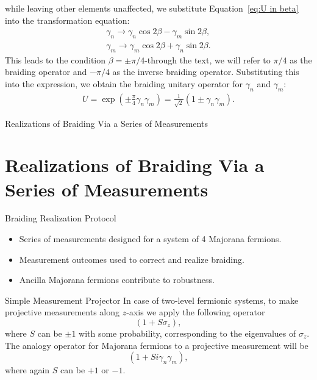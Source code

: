 \documentclass{loyola-beamer}
\begin{document}
\begin{frame}
	while leaving other elements unaffected, we substitute Equation~\ref{eq:U in beta} into the transformation equation:
	$$
		\begin{aligned}
			\gamma_n \rightarrow \gamma_n \cos{2 \beta}  - \gamma_m \sin{2 \beta}, \\
			\gamma_m \rightarrow \gamma_m \cos{2 \beta} + \gamma_n \sin{2 \beta} .
			\label{eq:subst in transformation}
		\end{aligned}
	$$
	This leads to the condition $ \beta = \pm \pi / 4 $-through the text, we will refer to $ \pi /4 $ as the braiding operator and $ -\pi /4 $ as the inverse braiding operator. Substituting this into the expression, we obtain the braiding unitary operator for $ \gamma_n $ and $ \gamma_m $:
	$$
		\begin{aligned}
			U = \exp \left( \pm \frac{\pi}{4} \gamma_n \gamma_m\right) = \frac{1}{\sqrt{2}}\left(1 \pm \gamma_n \gamma_m\right).
		\end{aligned}
	$$

\end{frame}


\begin{titleframe}{Realizations of Braiding Via a Series of Measurements}
\end{titleframe}
\section{Realizations of Braiding Via a Series of Measurements}

\begin{frame}{Braiding Realization Protocol}
	\begin{itemize}
		\item Series of measurements designed for a system of 4 Majorana fermions.
		\item Measurement outcomes used to correct and realize braiding.
		\item Ancilla Majorana fermions contribute to robustness.
	\end{itemize}
\end{frame}

\begin{frame}{Simple Measurement Projector}
	In case of two-level fermionic systems, to make projective measurements along $ z $-axis we apply the following operator
	\begin{equation*}
		(1 + S \sigma_z),
	\end{equation*}
	where $ S $ can be $ \pm 1 $ with some probability, corresponding to the eigenvalues of $ \sigma_z $. The analogy operator for Majorana fermions to a projective measurement will be
	\[
		(1 + S i \gamma_n \gamma_m),
	\]
	where again $ S $ can be $ +1 $ or $ -1 $.
\end{frame}
\end{document}

